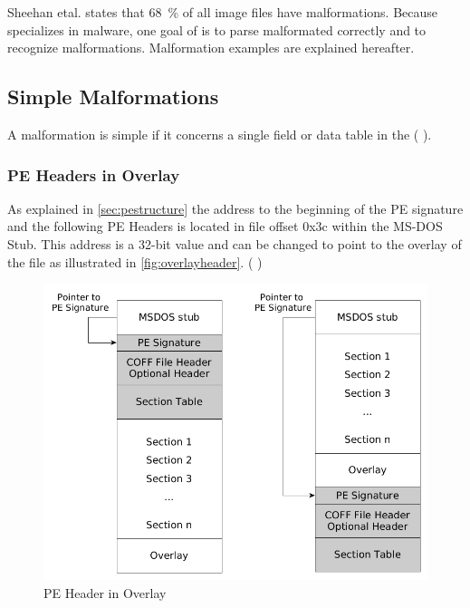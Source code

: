 Sheehan et\thinspace{}al. states that 68~\% of all image files have malformations. \cite[slide 7]{sheehan07}
Because \portex{} specializes in \PE{} malware, one goal of \portex{} is to parse malformated  correctly and to recognize malformations.
Malformation examples are explained hereafter.

\subsection{Simple Malformations}

A malformation is simple if it concerns a single field or data table in the \PE{} (\cf{} \cite[slide 7]{vuksan11}).

\subsubsection*{PE Headers in Overlay}

As explained in \autoref{sec:pestructure} the address to the beginning of the PE signature and the following PE Headers is located in file offset 0x3c within the MS-DOS Stub. This address is a 32-bit value and can be changed to point to the overlay of the file as illustrated in \autoref{fig:overlayheader}. (\cf{} \cite[slide 13]{vuksan11})

\begin{figure}
\includegraphics[width=.98\textwidth, height=.60\textheight,keepaspectratio]{graphics/overlayheader}
\caption{PE Header in Overlay }
\label{fig:overlayheader} 
\end{figure}

